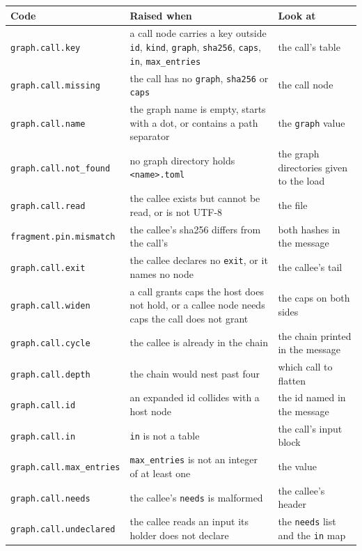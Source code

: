 \begin{longtable}{@{}p{}p{}p{}@{}}
	\toprule
	\textbf{Code} & \textbf{Raised when} & \textbf{Look at} \\
	\midrule
	\endhead
	\texttt{graph.call.key} & a call node carries a key outside \texttt{id}, \texttt{kind},
	\texttt{graph}, \texttt{sha256}, \texttt{caps}, \texttt{in}, \texttt{max\_entries} & the call's
	table \\
	\texttt{graph.call.missing} & the call has no \texttt{graph}, \texttt{sha256} or \texttt{caps}
	& the call node \\
	\texttt{graph.call.name} & the graph name is empty, starts with a dot, or contains a path
	separator & the \texttt{graph} value \\
	\texttt{graph.call.not\_found} & no graph directory holds \texttt{<name>.toml} & the graph
	directories given to the load \\
	\texttt{graph.call.read} & the callee exists but cannot be read, or is not UTF-8 & the file \\
	\texttt{fragment.pin.mismatch} & the callee's sha256 differs from the call's & both hashes in the
	message \\
	\texttt{graph.call.exit} & the callee declares no \texttt{exit}, or it names no node & the
	callee's tail \\
	\texttt{graph.call.widen} & a call grants caps the host does not hold, or a callee node needs caps
	the call does not grant & the caps on both sides \\
	\texttt{graph.call.cycle} & the callee is already in the chain & the chain printed in the message
	\\
	\texttt{graph.call.depth} & the chain would nest past four & which call to flatten \\
	\texttt{graph.call.id} & an expanded id collides with a host node & the id named in the message
	\\
	\texttt{graph.call.in} & \texttt{in} is not a table & the call's input block \\
	\texttt{graph.call.max\_entries} & \texttt{max\_entries} is not an integer of at least one & the
	value \\
	\texttt{graph.call.needs} & the callee's \texttt{needs} is malformed & the callee's header \\
	\texttt{graph.call.undeclared} & the callee reads an input its holder does not declare & the
	\texttt{needs} list and the \texttt{in} map \\

\end{longtable}
